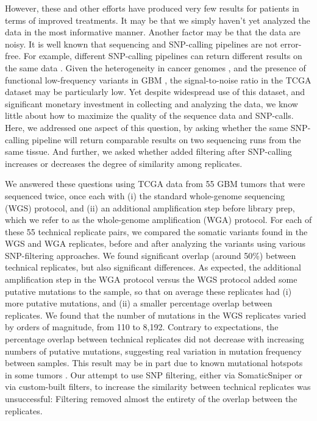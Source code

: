 \documentclass[11pt]{article} %
\begin{document}
However, these and other efforts have produced very few results for patients in terms of improved treatments. It may be that we simply haven't yet analyzed the data in the most informative manner. Another factor may be that the data are noisy. It is well known that sequencing and SNP-calling pipelines are not error-free. For example, different SNP-calling pipelines can return different results on the same data \citep{SNPcall}. Given the heterogeneity in cancer genomes \citep{heterogenous1, heterogenous2}, and the presence of functional low-frequency variants in GBM \citep{rare}, the signal-to-noise ratio in the TCGA dataset may be particularly low. Yet despite widespread use of this dataset, and significant monetary investment in collecting and analyzing the data, we know little about how to maximize the quality of the sequence data and SNP-calls. Here, we addressed one aspect of this question, by asking whether the same SNP-calling pipeline will return comparable results on two sequencing runs from the same tissue. And further, we asked whether added filtering after SNP-calling increases or decreases the degree of similarity among replicates.

We answered these questions using TCGA data from 55 GBM tumors that were sequenced twice, once each with (i) the standard whole-genome sequencing (WGS) protocol, and (ii) an additional amplification step before library prep, which we refer to as the whole-genome amplification (WGA) protocol. For each of these 55 technical replicate pairs, we compared the somatic variants found in the WGS and WGA replicates, before and after analyzing the variants using various SNP-filtering approaches. We found significant overlap (around 50\%) between technical replicates, but also significant differences. As expected, the additional amplification step in the WGA protocol versus the WGS protocol added some putative mutations to the sample, so that on average these replicates had (i) more putative mutations, and (ii) a smaller percentage overlap between replicates. We found that the number of mutations in the WGS replicates varied by orders of magnitude, from 110 to 8,192. Contrary to expectations, the percentage overlap between technical replicates did not decrease with increasing numbers of putative mutations, suggesting real variation in mutation frequency between samples. This result may be in part due to known mutational hotspots in some tumors \citep{Karen}. Our attempt to use SNP filtering, either via SomaticSniper \citep{SomaticSniper} or via custom-built filters, to increase the similarity between technical replicates was unsuccessful: Filtering removed almost the entirety of the overlap between the replicates.
\end{document}

